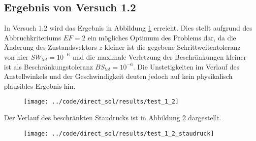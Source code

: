 \subsection{Ergebnis von Versuch 1.2}\label{kap:Versuch12}
In Versuch 1.2 wird das Ergebnis in Abbildung \ref{img:test_1_2} erreicht. Dies stellt aufgrund des Abbruchkriteriums $EF = 2$ ein mögliches Optimum des Problems dar, da die Änderung des Zustandsvektors $z$ kleiner ist die gegebene Schrittweitentoleranz von hier $SW_{tol} = 10^{-6}$ und die maximale Verletzung der Beschränkungen kleiner ist als Beschränkungstoleranz $BS_{tol} = 10^{-6}$. Die Unstetigkeiten im Verlauf des Anstellwinkels und der Geschwindigkeit deuten jedoch auf kein physikalisch plausibles Ergebnis hin.
\begin{figure}[H]
\begin{center}
\texttt{[image: ../code/direct\_sol/results/test\_1\_2]}
 \label{img:test_1_2}
\end{center}
\end{figure}
Der Verlauf des beschränkten Staudrucks ist in Abbildung \ref{img:test_1_2_staudruck} dargestellt.
\begin{figure}[H]
\begin{center}
\texttt{[image: ../code/direct\_sol/results/test\_1\_2\_staudruck]}
 \label{img:test_1_2_staudruck}
\end{center}
\end{figure}
















\newpage

